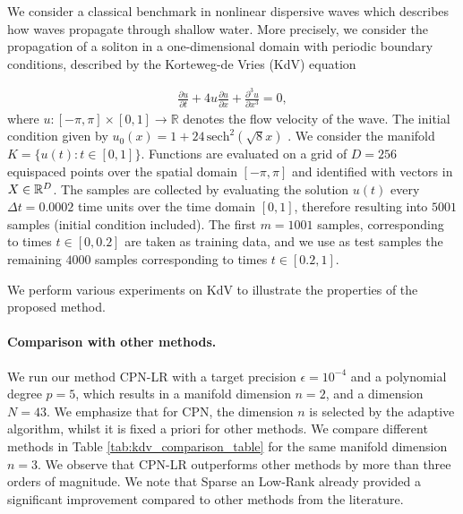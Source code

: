 
We consider a classical benchmark in nonlinear dispersive waves which  describes how waves propagate through shallow water. More precisely, we consider the propagation 
of a soliton in a one-dimensional domain with periodic boundary conditions, described by the 
 Korteweg-de Vries (KdV) equation 

\begin{align*}
    \frac{\partial u}{\partial t} + 4 u \frac{\partial u}{\partial x} + \frac{\partial^3 u}{\partial x^3} = 0,
\end{align*}
where $ u : [-\pi, \pi] \times [0, 1] \to \mathbb{R}$ denotes the flow velocity of the wave. The initial condition given by $ u_0(x) = 1 + 24\,  \text{sech}^2(\sqrt 8 x) $ \cite{geelen2024}. We consider the manifold  $K = \{u(t) : t\in [0,1]\}$. 
Functions are evaluated on a grid of $D= 256$ equispaced points over the spatial domain $ [-\pi, \pi] $ and identified with vectors in $X \in \mathbb{R}^D$. The samples are collected by evaluating the solution $u(t)$ every $ \Delta t = 0.0002 $ time units over the time domain $ [0, 1] $, therefore resulting into $5001 $  samples (initial condition included). The first $m= 1001 $ samples, corresponding to times $ t \in [0, 0.2] $ are taken as training data, and we use as test samples the remaining $4000$ samples corresponding to times $t\in [0.2,1]$. 

We perform various experiments on KdV to illustrate the properties of the proposed method. 

\paragraph{Comparison with other methods.}

We  run our method CPN-LR with a target precision $\epsilon=10^{-4}$ and a polynomial degree $p=5$, which results in a manifold dimension $n=2$, and a dimension $N=43$. We emphasize that for CPN, the dimension $ n $ is selected by the adaptive algorithm, whilst it is fixed a priori for other methods. We compare different methods in Table \ref{tab:kdv_comparison_table} for the same manifold dimension $ n = 3 $. We observe that CPN-LR outperforms other methods by more than three orders of magnitude. We note that Sparse an Low-Rank already provided a significant improvement compared to other methods from the literature. 

